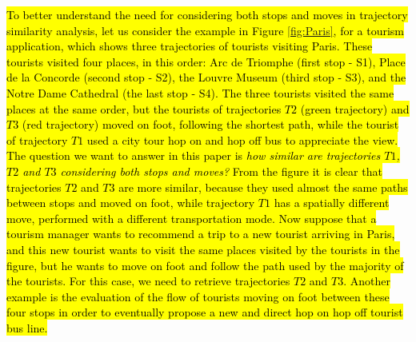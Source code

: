 \documentclass[12pt]{article}
\begin{document}
\hl{To better understand the need for considering both stops and moves in trajectory similarity analysis, let us consider the example in Figure {\ref{fig:Paris}}, for a tourism application, which shows three trajectories of tourists visiting Paris. These tourists visited four places, in this order:  Arc de Triomphe (first stop - S1), Place de la Concorde (second stop - S2), the Louvre Museum (third stop - S3), and the Notre Dame Cathedral (the last stop - S4). The three tourists visited the same places at the same order, but the tourists of trajectories $T2$ (green trajectory) and $T3$ (red trajectory) moved on foot, following the shortest path, while the tourist of trajectory $T1$ used a city tour hop on and hop off bus to appreciate the view. The question we want to answer in this paper is \emph{how similar are trajectories $T1$, $T2$ and $T3$ considering both stops and moves?} From the figure it is clear that trajectories $T2$ and $T3$ are more similar, because they used almost the same paths between stops and moved on foot, while trajectory $T1$ has a spatially different move, performed with a different transportation mode. Now suppose that a tourism manager wants to recommend a trip to a new tourist arriving in Paris, and this new tourist wants to visit the same places visited by the tourists in the figure, but he wants to move on foot and follow the path used by the majority of the tourists.
For this case, we need to retrieve trajectories $T2$ and $T3$. 
Another example is the evaluation of the flow of tourists moving on foot between these four stops in order to eventually propose a new and direct hop on hop off tourist bus line.}
\end{document}
